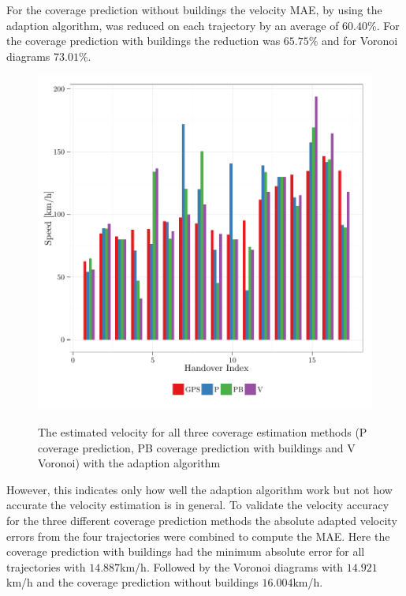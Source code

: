 For the coverage prediction without buildings the velocity MAE, by using the adaption algorithm, was reduced on each trajectory by an average of $60.40\%$. For the coverage prediction with buildings the reduction was $65.75\%$ and for Voronoi diagrams $73.01\%$. 
\begin{figure}[h!]
		
		\caption{ The estimated velocity for all three coverage estimation methods (P coverage prediction, PB coverage prediction with buildings and V Voronoi) with the adaption algorithm
		}
		\includegraphics[width=0.9\columnwidth]{images/563_SpeedsWithAdaption}
		\label{fig:velocityadaption}
	\end{figure}
However, this indicates only how well the adaption algorithm work but not how accurate the velocity estimation is in general. To validate the velocity accuracy for the three different coverage prediction methods the absolute adapted velocity errors from the four trajectories were combined to compute the MAE. Here the coverage prediction with buildings had the minimum absolute error for all trajectories with $14.887$km/h. Followed by the Voronoi diagrams with $14.921$km/h and the coverage prediction without buildings $16.004$km/h. 


